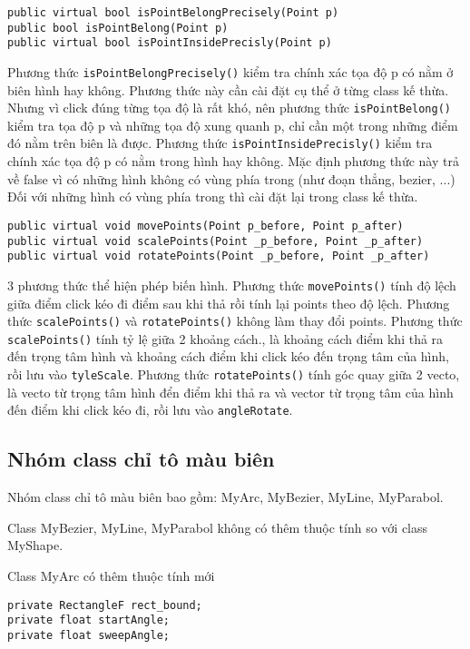 \documentclass[12pt]{article}
\begin{document}
\begin{lstlisting}
public virtual bool isPointBelongPrecisely(Point p)
public bool isPointBelong(Point p)
public virtual bool isPointInsidePrecisly(Point p)
\end{lstlisting}

Phương thức \texttt{isPointBelongPrecisely()} kiểm tra chính xác tọa độ p có nằm ở biên hình hay không.
Phương thức này cần cài đặt cụ thể ở từng class kế thừa.
Nhưng vì click đúng từng tọa độ là rất khó,
nên phương thức \texttt{isPointBelong()} kiểm tra tọa độ p và những tọa độ xung quanh p,
chỉ cần một trong những điểm đó nằm trên biên là được.
Phương thức \texttt{isPointInsidePrecisly()} kiểm tra chính xác tọa độ p có nằm trong hình hay không.
Mặc định phương thức này trả về false vì có những hình không có vùng phía trong (như đoạn thẳng, bezier, ...)
Đối với những hình có vùng phía trong thì cài đặt lại trong class kế thừa.

\begin{lstlisting}
public virtual void movePoints(Point p_before, Point p_after)
public virtual void scalePoints(Point _p_before, Point _p_after)
public virtual void rotatePoints(Point _p_before, Point _p_after)
\end{lstlisting}

3 phương thức thể hiện phép biến hình.
Phương thức \texttt{movePoints()} tính độ lệch giữa điểm click kéo đi điểm sau khi thả rồi tính lại points theo độ lệch.
Phương thức \texttt{scalePoints()} và \texttt{rotatePoints()} không làm thay đổi points.
Phương thức \texttt{scalePoints()}  tính tỷ lệ giữa 2 khoảng cách., là khoảng cách điểm khi thả ra đến trọng tâm hình
và khoảng cách điểm khi click kéo đến trọng tâm của hình, rồi lưu vào \texttt{tyleScale}.
Phương thức \texttt{rotatePoints()} tính góc quay giữa 2 vecto, là vecto từ trọng tâm hình đển điểm khi thả ra
và vector từ trọng tâm của hình đến điểm khi click kéo đi, rồi lưu vào \texttt{angleRotate}.

\subsection{Nhóm class chỉ tô màu biên}
Nhóm class chỉ tô màu biên bao gồm: MyArc, MyBezier, MyLine, MyParabol.

Class MyBezier, MyLine, MyParabol không có thêm thuộc tính so với class MyShape.

Class MyArc có thêm thuộc tính mới
\begin{lstlisting}
private RectangleF rect_bound;
private float startAngle;
private float sweepAngle;
\end{lstlisting}
\end{document}
